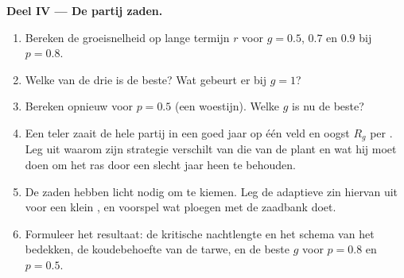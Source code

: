 \begin{problem}
\medskip
\noindent\textbf{Deel IV --- De partij zaden.}
\begin{enumerate}[resume]
  \item Bereken de groeisnelheid op lange termijn $r$ voor $g = 0.5$, $0.7$
        en $0.9$ bij $p = 0.8$.
  \item Welke van de drie is de beste? Wat gebeurt er bij $g = 1$?
  \item Bereken opnieuw voor $p = 0.5$ (een woestijn). Welke $g$ is nu de
        beste?
  \item Een teler zaait de hele partij in een goed jaar op één veld en oogst
        $R_g$ per . Leg uit waarom zijn strategie verschilt van die van
        de plant en wat hij moet doen om het ras door een slecht jaar heen te
        behouden.
  \item De zaden hebben licht nodig om te kiemen. Leg de adaptieve zin
        hiervan uit voor een klein , en voorspel wat ploegen met de
        zaadbank doet.
  \item Formuleer het resultaat: de kritische nachtlengte en het schema van
        het bedekken, de koudebehoefte van de tarwe, en de beste $g$ voor
        $p = 0.8$ en $p = 0.5$.
\end{enumerate}
\end{problem}
